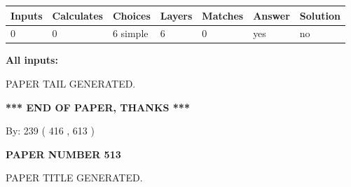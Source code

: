 \documentclass[12pt]{article}
\begin{document}
   
   
   
\noindent\begin{tabular}{|l|l|l|l|l|l|l|}
 \hline
Inputs & Calculates & Choices & Layers & Matches & Answer & Solution \\ \hline
 0  & 
 0  & 
 6
  simple  
  & 
 6  & 
 0  & 
  yes & 
  no 
  \\ \hline
 \end{tabular}
   
   
   
   
\noindent{}
   
   
   
   
\noindent\vspace{0.1in}\hspace{-0.08in} {\textbf{\Large{All inputs: }}}
   
   
   
   
   
   
 \vspace{0.2in}
 
   
   
\vspace{2.0in} PAPER TAIL GENERATED.
   
   
   
   
\vspace{1.0in} 
{\textbf{\large{ *** END OF PAPER, THANKS *** }}} 
   
   
\hspace{1.0in} By: 
 239 ( 416 ,  613 )
   
   
   
   
\newpage 
\setcounter{page}{ 
   513001 } 
   
   
   
   
 {\textbf{ \Large{ PAPER NUMBER  513  }}}
   
   
\vspace{0.2in}
   
   
   
   
   
   
   
   
 \vspace{0.2in}
 
 
 
 
   
   
 PAPER TITLE GENERATED.
   
   
   
\end{document}
